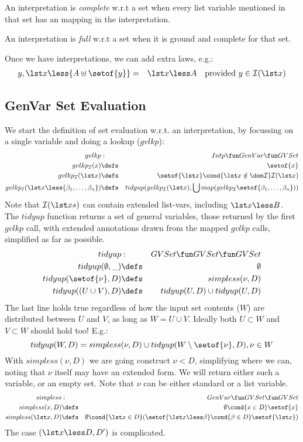 An interpretation is \emph{complete} w.r.t a set 
when every list variable mentioned in that set 
has an mapping in the interpretation.

An interpretation is \emph{full} w.r.t a set 
when it is ground and complete for that set.

Once we have interpretations,
we can add extra laws, e.g.:
\begin{eqnarray*}
   y,\lst x \less{A \uplus \setof{y}} 
   &=& \lst x \less A
   \quad \text{provided } y \in \intp(\lst x)
\end{eqnarray*}

\subsection{GenVar Set Evaluation}

We start the definition of set evaluation w.r.t. an interpretation,
by focussing on a single variable and doing a lookup ($gvlkp$):
\begin{eqnarray}
   gvlkp                   &  :  & Intp \fun GenVar \fun GVSet
\\ gvlkp_\intp(x)      &\defs& \setof{x}
\\ gvlkp_\intp(\lst x)
   &\defs& 
   \setof{\lst x} \cond{\lst x \notin \dom\intp} \intp(\lst x)
\\ gvlkp_I(\lst x \less{\beta_1,\dots,\beta_n})
   &\defs& 
   tidyup
     (  gvlkp_\intp(\lst x)
     ,  \bigcup map(gvlkp_\intp\setof{\beta_1,\dots,\beta_n}) )
\end{eqnarray}
Note that $\intp(\lst xs)$ can contain extended list-vars,
including $\lst x\less B$.
The $tidyup$ function returns a set of general variables,
those returned by the first $gvlkp$ call,
with extended annotations drawn from the mapped $gvlkp$ calls,
simplified as far as possible.
\begin{eqnarray}
   tidyup &:& GVSet \fun GVSet \fun GVSet
\\ tidyup(\emptyset,\_) &\defs& \emptyset
\\ tidyup(\setof{\nu},D) &\defs& simpless(\nu,D)
\\ tidyup((U \cup V),D) 
   &\defs& tidyup(U,D) \cup tidyup(U,D)
\end{eqnarray}
The last line holds true regardless of how the input set contents ($W$)
are distributed between $U$ and $V$, as long as $W=U \cup V$.
Ideally both $U \subset W$ and $V \subset W$ should hold too!
E.g.:
%
$$
  tidyup(W,D) 
  =
  simpless(\nu,D)
  \cup 
  tidyup(W\setminus\setof{\nu},D)
  , \nu \in W
$$
With $simpless(\nu,D)$ we are going construct $\nu\less{D}$,
simplifying where we can, noting that $\nu$ itself may have an extended form.
We will return either such a variable, or an empty set.
Note that $\nu$ can be either standard or a list variable.
\begin{eqnarray}
   simpless &:& GenVar \fun GVSet \fun GVSet
\\ simpless(x,D) &\defs& \emptyset \cond{x \in D} \setof{x}
\\ simpless(\lst x,D)
   &\defs&
   \emptyset
   \cond{\lst x \in D}
   ( \setof{\lst x\less\beta}
     \cond{ \beta \in D}
     \setof{\lst x}
   )
\end{eqnarray}
The case $(\lst x\less D,D')$ is complicated.


